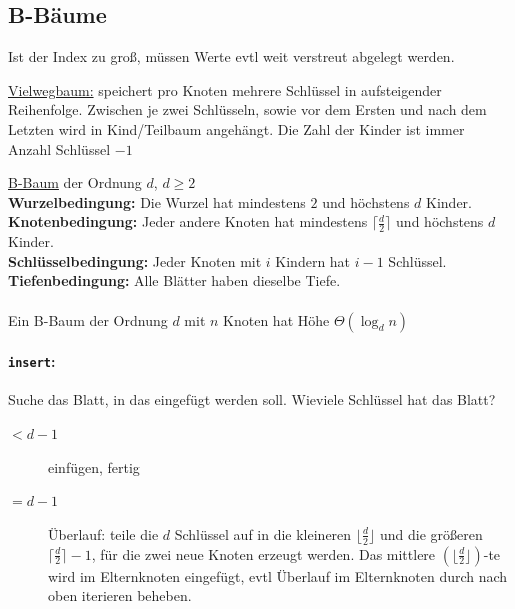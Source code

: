 \documentclass{scrartcl}
\begin{document}
{\Huge {}}

\subsection{B-Bäume}
Ist der Index zu groß, müssen Werte evtl weit verstreut abgelegt werden. \\

\begin{shaded}
\underline{Vielwegbaum:} speichert pro Knoten mehrere Schlüssel in aufsteigender Reihenfolge. Zwischen je zwei Schlüsseln, sowie vor dem Ersten und nach dem Letzten wird in Kind/Teilbaum angehängt. Die Zahl der Kinder ist immer Anzahl Schlüssel $-1$

\underline{B-Baum} der Ordnung $d$, $d\geq 2$ \\
\textbf{Wurzelbedingung:} Die Wurzel hat mindestens $2$ und höchstens $d$ Kinder. \\
\textbf{Knotenbedingung:} Jeder andere Knoten hat mindestens $\lceil \frac{d}{2}\rceil$ und höchstens $d$ Kinder. \\
\textbf{Schlüsselbedingung:} Jeder Knoten mit $i$ Kindern hat $i-1$ Schlüssel. \\
\textbf{Tiefenbedingung:} Alle Blätter haben dieselbe Tiefe. \\ \ \\
Ein B-Baum der Ordnung $d$ mit $n$ Knoten hat Höhe $\Theta(\log_d n)$
\end{shaded}

\paragraph{\texttt{insert}:} Suche das Blatt, in das eingefügt werden soll. Wieviele Schlüssel hat das Blatt?
\begin{description}
	\item[$<d-1$] einfügen, fertig
	\item[$=d-1$] Überlauf: teile die $d$ Schlüssel auf in die kleineren $\lfloor \frac{d}{2} \rfloor$ und die größeren $\lceil \frac{d}{2} \rceil-1$, für die zwei neue Knoten erzeugt werden. Das mittlere $(\lfloor \frac{d}{2} \rfloor)$-te wird im Elternknoten eingefügt, evtl Überlauf im Elternknoten durch nach oben iterieren beheben.
\end{description}
\end{document}
